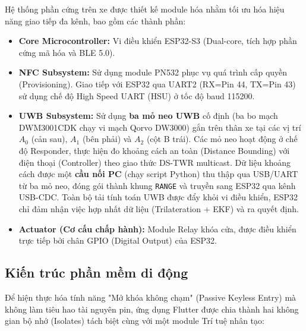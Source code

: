 Hệ thống phần cứng trên xe được thiết kế module hóa nhằm tối ưu hóa hiệu năng giao tiếp đa kênh, bao gồm các thành phần:
\begin{itemize}
    \item \textbf{Core Microcontroller:} Vi điều khiển ESP32-S3 (Dual-core, tích hợp phần cứng mã hóa và BLE 5.0).
    \item \textbf{NFC Subsystem:} Sử dụng module PN532 phục vụ quá trình cấp quyền (Provisioning). Giao tiếp với ESP32 qua UART2 (RX=Pin 44, TX=Pin 43) sử dụng chế độ High Speed UART (HSU) ở tốc độ baud 115200.
    \item \textbf{UWB Subsystem:} Sử dụng \textbf{ba mỏ neo UWB} cố định (ba bo mạch DWM3001CDK chạy vi mạch Qorvo DW3000) gắn trên thân xe tại các vị trí $A_0$ (cản sau), $A_1$ (bên phải) và $A_2$ (cột B trái). Các mỏ neo hoạt động ở chế độ Responder, thực hiện đo khoảng cách an toàn (Distance Bounding) với điện thoại (Controller) theo giao thức DS-TWR multicast. Dữ liệu khoảng cách được một \textbf{cầu nối PC} (chạy script Python) thu thập qua USB/UART từ ba mỏ neo, đóng gói thành khung \texttt{RANGE} và truyền sang ESP32 qua kênh USB-CDC. Toàn bộ tải tính toán UWB được đẩy khỏi vi điều khiển, ESP32 chỉ đảm nhận việc hợp nhất dữ liệu (Trilateration + EKF) và ra quyết định.
    \item \textbf{Actuator (Cơ cấu chấp hành):} Module Relay khóa cửa, được điều khiển trực tiếp bởi chân GPIO (Digital Output) của ESP32.
\end{itemize}

\subsection{Kiến trúc phần mềm di động}

Để hiện thực hóa tính năng "Mở khóa không chạm" (Passive Keyless Entry) mà không làm tiêu hao tài nguyên pin, ứng dụng Flutter được chia thành hai không gian bộ nhớ (Isolates) tách biệt cùng với một module Trí tuệ nhân tạo:

